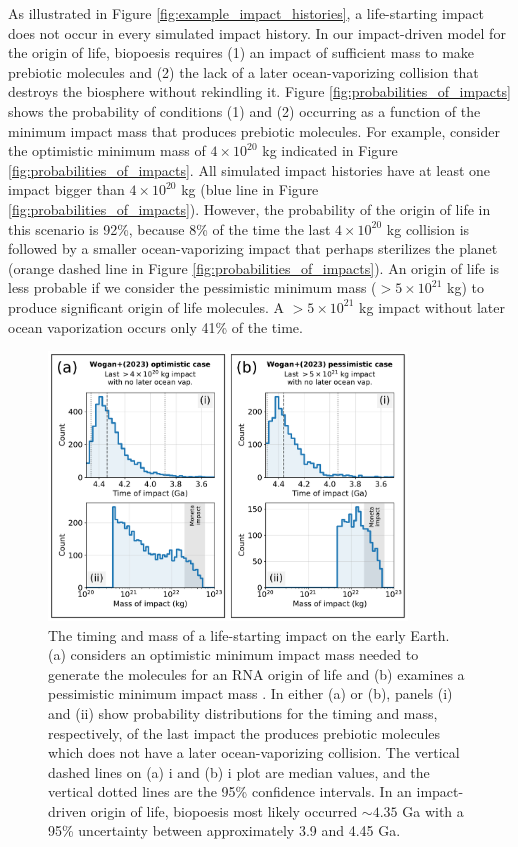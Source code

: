 \documentclass[preprint]{aastex63}
\begin{document}
As illustrated in Figure \ref{fig:example_impact_histories}, a life-starting impact does not occur in every simulated impact history. In our impact-driven model for the origin of life, biopoesis requires (1) an impact of sufficient mass to make prebiotic molecules and (2) the lack of a later ocean-vaporizing collision that destroys the biosphere without rekindling it. Figure \ref{fig:probabilities_of_impacts} shows the probability of conditions (1) and (2) occurring as a function of the minimum impact mass that produces prebiotic molecules. For example, consider the \citet{Wogan_2023} optimistic minimum mass of $4 \times 10^{20}$ kg indicated in Figure \ref{fig:probabilities_of_impacts}. All simulated impact histories have at least one impact bigger than $4 \times 10^{20}$ kg (blue line in Figure \ref{fig:probabilities_of_impacts}). However, the probability of the origin of life in this scenario is 92\%, because 8\% of the time the last $4 \times 10^{20}$ kg collision is followed by a smaller ocean-vaporizing impact that perhaps sterilizes the planet (orange dashed line in Figure \ref{fig:probabilities_of_impacts}). An origin of life is less probable if we consider the \citet{Wogan_2023} pessimistic minimum mass ($> 5 \times 10^{21}$ kg) to produce significant origin of life molecules. A $> 5 \times 10^{21}$ kg impact without later ocean vaporization occurs only 41\% of the time.

\begin{figure}
  \centering
  \includegraphics[width=0.85\textwidth]{figures/timing_and_mass.pdf}
  \caption{The timing and mass of a life-starting impact on the early Earth. (a) considers an optimistic minimum impact mass needed to generate the molecules for an RNA origin of life and (b) examines a pessimistic minimum impact mass \citep{Wogan_2023}. In either (a) or (b), panels (i) and (ii) show probability distributions for the timing and mass, respectively, of the last impact the produces prebiotic molecules which does not have a later ocean-vaporizing collision. The vertical dashed lines on (a) i and (b) i plot are median values, and the vertical dotted lines are the 95\% confidence intervals. In an impact-driven origin of life, biopoesis most likely occurred $\sim 4.35$ Ga with a 95\% uncertainty between approximately 3.9 and 4.45 Ga.}
  \label{fig:time_and_mass}
\end{figure}
\end{document}
